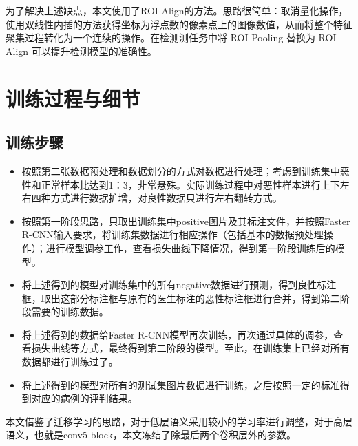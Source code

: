 \begin{itemize}
为了解决上述缺点，本文使用了ROI Align的方法。思路很简单：取消量化操作，使用双线性内插的方法获得坐标为浮点数的像素点上的图像数值，从而将整个特征聚集过程转化为一个连续的操作。在检测测任务中将 ROI Pooling 替换为 ROI Align 可以提升检测模型的准确性。

\end{itemize}

\section{训练过程与细节}
\subsection{训练步骤}
\begin{itemize}
	\item 按照第二张数据预处理和数据划分的方式对数据进行处理；考虑到训练集中恶性和正常样本比达到1：3，非常悬殊。实际训练过程中对恶性样本进行上下左右四种方式进行数据扩增，对良性数据只进行左右翻转方式。
	\item 按照第一阶段思路，只取出训练集中positive图片及其标注文件，并按照Faster R-CNN输入要求，将训练集数据进行相应操作（包括基本的数据预处理操作）；进行模型调参工作，查看损失曲线下降情况，得到第一阶段训练后的模型。
	\item 将上述得到的模型对训练集中的所有negative数据进行预测，得到良性标注框，取出这部分标注框与原有的医生标注的恶性标注框进行合并，得到第二阶段需要的训练数据。
	\item 将上述得到的数据给Faster R-CNN模型再次训练，再次通过具体的调参，查看损失曲线等方式，最终得到第二阶段的模型。至此，在训练集上已经对所有数据都进行训练过了。
	\item 将上述得到的模型对所有的测试集图片数据进行训练，之后按照一定的标准得到对应的病例的评判结果。
\end{itemize}

本文借鉴了迁移学习的思路，对于低层语义采用较小的学习率进行调整，对于高层语义，也就是conv5 block，本文冻结了除最后两个卷积层外的参数。
